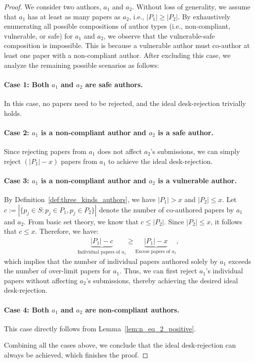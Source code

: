 \begin{proof}
We consider two authors, $a_1$ and $a_2$. Without loss of generality, we assume that $a_1$ has at least as many papers as $a_2$, i.e., $|P_1| \geq |P_2|$. By exhaustively enumerating all possible compositions of author types (i.e., non-compliant, vulnerable, or safe) for $a_1$ and $a_2$, we observe that the vulnerable-safe composition is impossible. This is because a vulnerable author must co-author at least one paper with a non-compliant author. After excluding this case, we analyze the remaining possible scenarios as follows:

\paragraph{Case 1: Both $a_1$ and $a_2$ are safe authors.} 
In this case, no papers need to be rejected, and the ideal desk-rejection trivially holds.

\paragraph{Case 2: $a_1$ is a non-compliant author and $a_2$ is a safe author.} 
Since rejecting papers from $a_1$ does not affect $a_2$'s submissions, we can simply reject $(|P_1| - x)$ papers from $a_1$ to achieve the ideal desk-rejection.

\paragraph{Case 3: $a_1$ is a non-compliant author and $a_2$ is a vulnerable author.} 
By Definition~\ref{def:three_kinds_authors}, we have $|P_1| > x$ and $|P_2| \le x$. Let $c := |\{p_j \in S: p_j \in P_1, p_j \in P_2\}|$ denote the number of co-authored papers by $a_1$ and $a_2$. From basic set theory, we know that $c \leq |P_2|$. Since $|P_2| \le x$, it follows that $c \le x$. Therefore, we have:
\begin{align*}
    \underbrace{|P_1| - c}_{\text{Individual papers of } a_1} \ge \underbrace{|P_1| - x}_{\text{Excess papers of } a_1},
\end{align*}
which implies that the number of individual papers authored solely by $a_1$ exceeds the number of over-limit papers for $a_1$. Thus, we can first reject $a_1$'s individual papers without affecting $a_2$'s submissions, thereby achieving the desired ideal desk-rejection.

\paragraph{Case 4: Both $a_1$ and $a_2$ are non-compliant authors.} 
This case directly follows from Lemma~\ref{lem:n_eq_2_positive}.

Combining all the cases above, we conclude that the ideal desk-rejection can always be achieved, which finishes the proof.
\end{proof}


